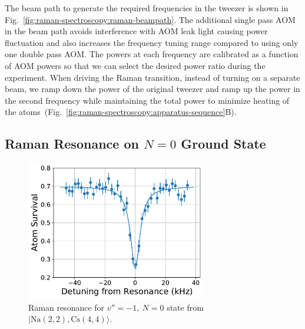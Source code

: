 The beam path to generate the required frequencies in the tweezer is shown in
Fig.~\ref{fig:raman-spectroscopy:raman-beampath}.
The additional single pass AOM in the beam path avoids interference
with AOM leak light causing power fluctuation and
also increases the frequency tuning range compared to using only one double pass AOM.
The powers at each frequency are calibrated as a function of AOM powers
so that we can select the desired power ratio during the experiment.
When driving the Raman transition, instead of turning on a separate beam,
we ramp down the power of the original tweezer and ramp up the power
in the second frequency while maintaining the total power to minimize heating of
the atoms~(Fig.~\ref{fig:raman-spectroscopy:apparatus-sequence}B).

\subsection{Raman Resonance on \texorpdfstring{$N=0$}{N=0} Ground State}
\label{ch:raman-spectroscopy:states:n0}

\begin{figure}
  \centering
  \includegraphics[width=0.7\textwidth]{figures/raman_spectroscopy_resonance.pdf}
  \caption[Raman resonance for $v''=-1,\ N=0$ state]{
    Raman resonance for $v''=-1,\ N=0$ state from $|\mathrm{Na(2, 2),Cs(4, 4)}\rangle$.
    \label{fig:raman-spectroscopy:resonance}}
\end{figure}

